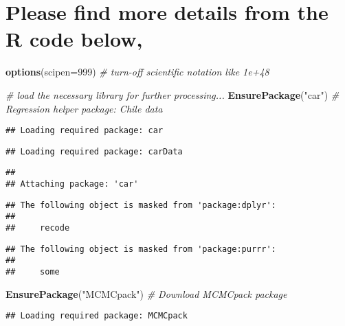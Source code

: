 \documentclass[]{article}
\newenvironment{Shaded}{\begin{snugshade}}{\end{snugshade}}
\newcommand{\CommentTok}[1]{\textcolor[rgb]{0.56,0.35,0.01}{\textit{#1}}}
\newcommand{\DataTypeTok}[1]{\textcolor[rgb]{0.13,0.29,0.53}{#1}}
\newcommand{\DecValTok}[1]{\textcolor[rgb]{0.00,0.00,0.81}{#1}}
\newcommand{\KeywordTok}[1]{\textcolor[rgb]{0.13,0.29,0.53}{\textbf{#1}}}
\newcommand{\NormalTok}[1]{#1}
\newcommand{\StringTok}[1]{\textcolor[rgb]{0.31,0.60,0.02}{#1}}
\begin{document}
\hypertarget{please-find-more-details-from-the-r-code-below-2}{%
\section{Please find more details from the R code
below,}\label{please-find-more-details-from-the-r-code-below-2}}

\begin{Shaded}
\begin{Highlighting}[]
\KeywordTok{options}\NormalTok{(}\DataTypeTok{scipen=}\DecValTok{999}\NormalTok{)  }\CommentTok{# turn-off scientific notation like 1e+48}

\CommentTok{# load the necessary library for further processing...}
\KeywordTok{EnsurePackage}\NormalTok{(}\StringTok{"car"}\NormalTok{) }\CommentTok{# Regression helper package: Chile data}
\end{Highlighting}
\end{Shaded}

\begin{verbatim}
## Loading required package: car
\end{verbatim}

\begin{verbatim}
## Loading required package: carData
\end{verbatim}

\begin{verbatim}
## 
## Attaching package: 'car'
\end{verbatim}

\begin{verbatim}
## The following object is masked from 'package:dplyr':
## 
##     recode
\end{verbatim}

\begin{verbatim}
## The following object is masked from 'package:purrr':
## 
##     some
\end{verbatim}

\begin{Shaded}
\begin{Highlighting}[]
\KeywordTok{EnsurePackage}\NormalTok{(}\StringTok{"MCMCpack"}\NormalTok{) }\CommentTok{# Download MCMCpack package}
\end{Highlighting}
\end{Shaded}

\begin{verbatim}
## Loading required package: MCMCpack
\end{verbatim}
\end{document}
